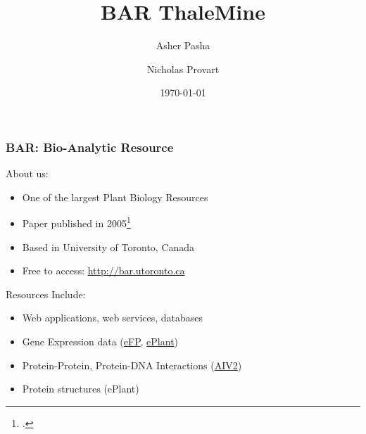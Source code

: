 \documentclass{beamer}
\begin{document}
\title[BAR ThaleMine] 
{BAR ThaleMine}
\author[Pasha, Provart]{Asher Pasha \and Nicholas Provart}
\date{\today}

\frame{\titlepage}

\begin{frame}
    \frametitle{BAR: Bio-Analytic Resource}
    About us:
    \begin{itemize}
        \item One of the largest Plant Biology Resources
        \item Paper published in 2005\footcite{bar2005}
        \item Based in University of Toronto, Canada
        \item Free to access: \href{http://bar.utoronto.ca}{http://bar.utoronto.ca}
    \end{itemize}
    Resources Include:
    \begin{itemize}
        \item Web applications, web services, databases
        \item Gene Expression data (\href{http://bar.utoronto.ca/efp}{eFP}, \href{http://bar.utoronto.ca/eplant}{ePlant})
        \item Protein-Protein, Protein-DNA Interactions (\href{http://bar.utoronto.ca/interactions2}{AIV2})
        \item Protein structures (ePlant)
    \end{itemize}
\end{frame}
\end{document}
